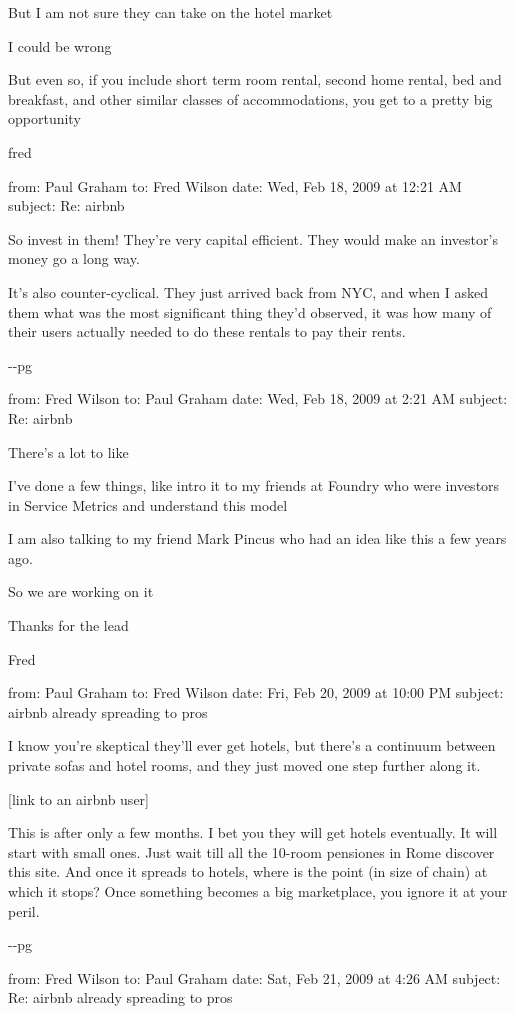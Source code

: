 \documentclass[12pt]{book}
\begin{document}
But I am not sure they can take on the hotel market

I could be wrong

But even so, if you include short term room rental, second home rental,
bed and breakfast, and other similar classes of accommodations, you get
to a pretty big opportunity

fred

from: Paul Graham to: Fred Wilson date: Wed, Feb 18, 2009 at 12:21 AM
subject: Re: airbnb

So invest in them! They're very capital efficient. They would make an
investor's money go a long way.

It's also counter-cyclical. They just arrived back from NYC, and when I
asked them what was the most significant thing they'd observed, it was
how many of their users actually needed to do these rentals to pay their
rents.

-\/-pg

from: Fred Wilson to: Paul Graham date: Wed, Feb 18, 2009 at 2:21 AM
subject: Re: airbnb

There's a lot to like

I've done a few things, like intro it to my friends at Foundry who were
investors in Service Metrics and understand this model

I am also talking to my friend Mark Pincus who had an idea like this a
few years ago.

So we are working on it

Thanks for the lead

Fred

from: Paul Graham to: Fred Wilson date: Fri, Feb 20, 2009 at 10:00 PM
subject: airbnb already spreading to pros

I know you're skeptical they'll ever get hotels, but there's a continuum
between private sofas and hotel rooms, and they just moved one step
further along it.

{[}link to an airbnb user{]}

This is after only a few months. I bet you they will get hotels
eventually. It will start with small ones. Just wait till all the
10-room pensiones in Rome discover this site. And once it spreads to
hotels, where is the point (in size of chain) at which it stops? Once
something becomes a big marketplace, you ignore it at your peril.

-\/-pg

from: Fred Wilson to: Paul Graham date: Sat, Feb 21, 2009 at 4:26 AM
subject: Re: airbnb already spreading to pros
\end{document}
